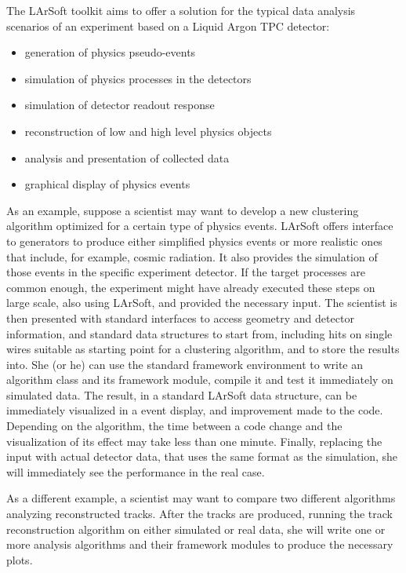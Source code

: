 
% 
% 

The LArSoft toolkit aims to offer a solution for the typical data analysis scenarios
of an experiment based on a Liquid Argon TPC detector:
\begin{itemize}
  \item generation of physics pseudo-events
  \item simulation of physics processes in the detectors
  \item simulation of detector readout response
  \item reconstruction of low and high level physics objects
  \item analysis and presentation of collected data
  \item graphical display of physics events
\end{itemize}

As an example, suppose a scientist may want to develop a new clustering algorithm
optimized for a certain type of physics events.
LArSoft offers interface to generators to produce either simplified physics events
or more realistic ones that include, for example, cosmic radiation.
It also provides the simulation of those events in the specific experiment detector.
If the target processes are common enough, the experiment might have already
executed these steps on large scale, also using LArSoft, and provided the necessary input.
The scientist is then presented with standard interfaces to access geometry and detector
information, and standard data structures to start from,
including hits on single wires suitable as starting point for a clustering algorithm,
and to store the results into.
She (or he) can use the standard framework environment to write an algorithm class
and its framework module, compile it and test it immediately on simulated data.
The result, in a standard LArSoft data structure, can be immediately visualized in a
event display, and improvement made to the code.
Depending on the algorithm, the time between a code change and the
visualization of its effect may take less than one minute.
Finally, replacing the input with actual detector data, that uses the same format
as the simulation, she will immediately see the performance in the real case.

As a different example, a scientist may want to compare two different algorithms
analyzing reconstructed tracks.
After the tracks are produced, running the track reconstruction algorithm
on either simulated or real data, she will write one or more analysis algorithms
and their framework modules to produce the necessary plots.

